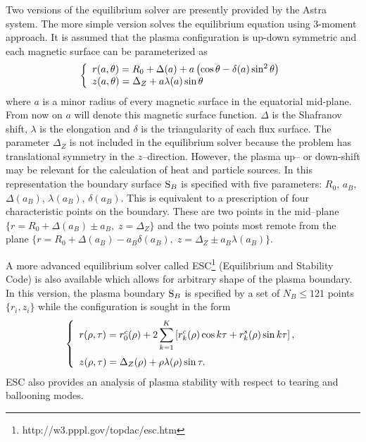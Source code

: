 Two versions of the equilibrium solver are presently provided by the
Astra system. 
The more simple version \cite{Z3m} solves the equilibrium equation
 using 3-moment approach. It is assumed that the plasma
configuration is up-down symmetric and each magnetic surface can be
parameterized as 
\begin{equation}\label{3mom}
\left\{\begin{array}{l}
r(a,\theta)=R_0+\Delta(a)+a\left(\cos\theta-\delta(a)\sin^2\theta\right)\\
z(a,\theta)=\Delta_Z+a\lambda(a)\sin\theta
\end{array}\right.
\end{equation}
where $a$ is a minor radius of every magnetic surface in the equatorial
mid-plane. 
From now on $a$ will denote this magnetic surface function. 
$\Delta$ is the Shafranov shift, $\lambda$ is the elongation and
$\delta$ is the triangularity of each flux surface. 
The parameter $\Delta_Z$ is not included in the equilibrium solver
because the problem has translational symmetry in the $z$--direction. 
However, the plasma up-- or down-shift may be relevant for the
calculation of heat and particle sources.
In this representation the
boundary surface  $\mbox{\cal S}_B$ is specified with five parameters:
$R_0$, $a_B$, $\Delta(a_B)$, $\lambda(a_B)$, $\delta(a_B)$. 
This is equivalent to a prescription of four characteristic points on
the boundary. 
These are two points in the mid--plane 
$\{r=R_0+\Delta(a_B)\pm a_B,\;z=\Delta_Z\}$ 
and the two points most remote from the plane
$\{r=R_0+\Delta(a_B)-a_B\delta(a_B),\;z=\Delta_Z\pm a_B\lambda(a_B)\}$.

A more advanced equilibrium solver called
ESC\footnote{http://w3.pppl.gov/topdac/esc.htm}  
(Equilibrium and Stability Code) is also available \cite{ESC} 
which allows for arbitrary shape of the plasma boundary. 
In this version, the plasma boundary $\mbox{\cal S}_B$ is specified by
a set of $N_B\leq 121$ points $\{r_i,z_i\}$ 
while the configuration is sought in the form
\vspace*{-5pt}
\begin{equation}\label{sesconf}
\lb\{\begin{array}{l}
r(\rho,\tau)
=r_0^c(\rho)+2\ds\sum\limits_{k=1}^{K}
\lb[r_k^c(\rho)\cos k\tau+r_k^s(\rho)\sin k\tau\rb]
,\medskip\\
z(\rho,\tau)=\Delta_Z(\rho)+\rho\lambda(\rho)\sin\tau
.\end{array}\rb.
\end{equation}
ESC also provides an analysis of plasma stability with respect to tearing
and ballooning modes. 

